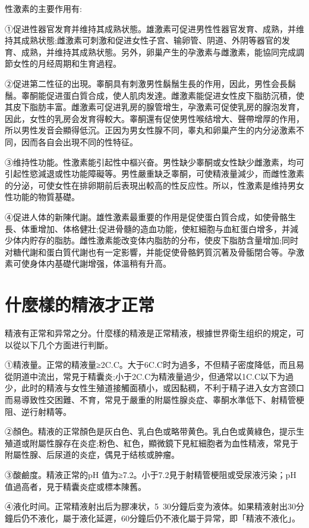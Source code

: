\documentclass[12pt,UTF8]{ctexbook}
\begin{document}
性激素的主要作用有:

①促进性器官发育并维持其成熟状態。雄激素可促进男性性器官发育、成熟，并维持其成熟状態;雌激素可刺激和促进女性子宫、输卵管、阴道、外阴等器官的发育、成熟，并维持其成熟状態。另外，卵巢产生的孕激素与雌激素，能協同完成調節女性的月经周期和生育過程。

②促进第二性征的出現。睾酮具有刺激男性鬍鬚生長的作用，因此，男性会長鬍鬚。睾酮能促进蛋白質合成，使人肌肉发達。雌激素能促进女性皮下脂肪沉積，使其皮下脂肪丰富。雌激素可促进乳房的腺管增生，孕激素可促使乳房的腺泡发育，因此，女性的乳房会发育得較大。睾酮還有促使男性喉结增大、聲帶增厚的作用，所以男性发音会顯得低沉。正因为男女性腺不同，睾丸和卵巢产生的内分泌激素不同，因而各自会出現不同的性特征。

③维持性功能。性激素能引起性中樞兴奋。男性缺少睾酮或女性缺少雌激素，均可引起性慾減退或性功能障礙等。男性嚴重缺乏睾酮，可使精液量減少，而雌性激素的分泌，可使女性在排卵期前后表現出較高的性反应性。所以，性激素是维持男女性功能的物質基礎。

④促进人体的新陳代謝。雄性激素最重要的作用是促使蛋白質合成，如使骨骼生長、体重增加、体格健壯;促进骨髓的造血功能，使紅細胞与血紅蛋白增多，并減少体内貯存的脂肪。雌性激素能改变体内脂肪的分布，使皮下脂肪含量增加;同时对糖代謝和蛋白質代謝也有一定影響，并能促使骨骼鈣質沉著及骨骺閉合等。孕激素可使身体内基礎代謝增强，体溫稍有升高。

\section{什麼樣的精液才正常}

精液有正常和异常之分。什麼樣的精液是正常精液，根據世界衛生组织的規定，可以從以下几个方面进行判斷。

①精液量。正常的精液量≥2C.C。大于6C.C时为過多，不但精子密度降低，而且易從阴道中流出，常見于精囊炎;小于2C.C为精液量過少，但通常以1C.C以下为過少，此时的精液与女性生殖道接觸面積小，或因黏稠，不利于精子进入女方宫颈口而易導致性交困難、不育，常見于嚴重的附屬性腺炎症、睾酮水準低下、射精管梗阻、逆行射精等。

②顏色。精液的正常顏色是灰白色、乳白色或略带黄色。乳白色或黄綠色，提示生殖道或附屬性腺存在炎症;粉色、紅色，顯微鏡下見紅細胞者为血性精液，常見于附屬性腺、后尿道的炎症，偶見于结核或肿瘤。

③酸鹼度。精液正常的pH 值为≥7.2。小于7.2見于射精管梗阻或受尿液污染；pH值過高者，見于精囊炎症或標本陳舊。

④液化时间。正常精液射出后为膠凍状，5~30分鐘后变为液体。如果精液射出30分鐘后仍不液化，屬于液化延遲，60分鐘后仍不液化屬于异常，即「精液不液化」。
\end{document}
